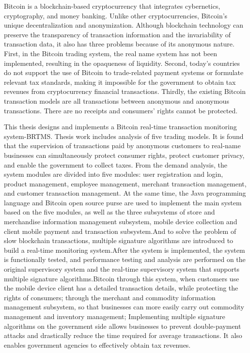 \begin{eabstract}
	Bitcoin is a blockchain-based cryptocurrency that integrates cybernetics, cryptography, and money banking. Unlike other cryptocurrencies, Bitcoin's unique decentralization and anonymization. Although blockchain technology can preserve the transparency of transaction information and the invariability of transaction data, it also has three problems because of its anonymous nature. First, in the Bitcoin trading system, the real name system has not been implemented, resulting in the opaqueness of liquidity. Second, today's countries do not support the use of Bitcoin to trade-related payment systems or formulate relevant tax standards, making it impossible for the government to obtain tax revenues from cryptocurrency financial transactions. Thirdly, the existing Bitcoin transaction models are all transactions between anonymous and anonymous transactions. There are no receipts and consumers' rights cannot be protected.


	This thesis designs and implements a Bitcoin real-time transaction monitoring system-BRTMS. Thesis work includes analysis of five trading models. It is found that the supervision of transactions paid by anonymous customers to real-name businesses can simultaneously protect consumer rights, protect customer privacy, and enable the government to collect taxes. From the demand analysis, the system modules are divided into five modules: user registration and login, product management, employee management, merchant transaction management, and customer transaction management. At the same time, the Java programming language and Bitcoin open source purse are used to implement the main system based on the five modules, as well as the three subsystems of store and merchandise information management subsystem, mobile device collection and client mobile payment and transaction subsystem.And to solve the problem of slow blockchain transactions, multiple signature algorithms are introduced to build a real-time monitoring system.After the system is implemented, the system is functionally tested, and performance testing and analysis are performed on the original supervisory system and the real-time supervisory system that supports multiple signature algorithms.Bitcoin through this system, when customers use the mobile device client has a detailed transaction details, while protecting the rights of consumers; through the merchant and commodity information management subsystem, so that businesses can more easily carry out commodity management and inventory management; Implementing multiple signature algorithms on the government side allows businesses to prevent double-payment attacks and drastically reduce the time required for average transactions. It also enables government agencies to effectively obtain tax revenues.

\end{eabstract}

